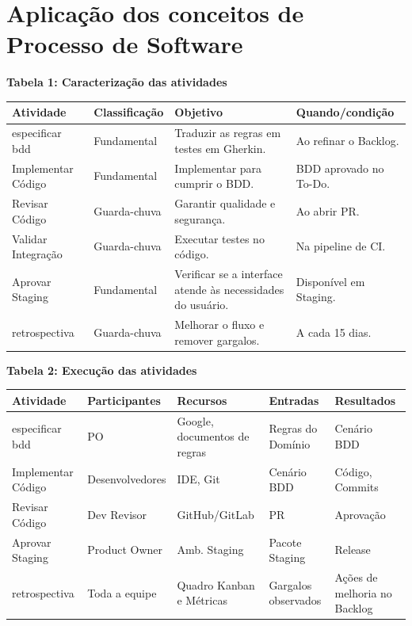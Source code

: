 \documentclass[12pt,a4paper]{article}
\begin{document}
\section{Aplicação dos conceitos de Processo de Software}

\textbf{Tabela 1: Caracterização das atividades} \\
\begin{tabularx}{\textwidth}{|l|l|X|X|}
\hline
Atividade & Classificação & Objetivo & Quando/condição \\
\hline
especificar bdd & Fundamental & Traduzir as regras em testes em Gherkin. & Ao refinar o Backlog. \\
\hline
Implementar Código & Fundamental & Implementar para cumprir o BDD. & BDD aprovado no To-Do. \\
\hline
Revisar Código & Guarda-chuva & Garantir qualidade e segurança. & Ao abrir PR. \\
\hline
Validar Integração & Guarda-chuva & Executar testes no código. & Na pipeline de CI. \\
\hline
Aprovar Staging & Fundamental & Verificar se a interface atende às necessidades do usuário. & Disponível em Staging. \\
\hline
retrospectiva & Guarda-chuva & Melhorar o fluxo e remover gargalos. & A cada 15 dias. \\
\hline
\end{tabularx}

\vspace{0.5cm}

\textbf{Tabela 2: Execução das atividades} \\
\begin{tabularx}{\textwidth}{|X|X|X|X|X|}
\hline
Atividade & Participantes & Recursos & Entradas & Resultados \\
\hline
especificar bdd & PO & Google, documentos de regras & Regras do Domínio & Cenário BDD \\
\hline
Implementar Código & Desenvolvedores & IDE, Git & Cenário BDD & Código, Commits \\
\hline
Revisar Código & Dev Revisor & GitHub/GitLab & PR & Aprovação \\
\hline
Aprovar Staging & Product Owner & Amb. Staging & Pacote Staging & Release \\
\hline
retrospectiva & Toda a equipe & Quadro Kanban e Métricas & Gargalos observados & Ações de melhoria no Backlog \\
\hline
\end{tabularx}
\end{document}

